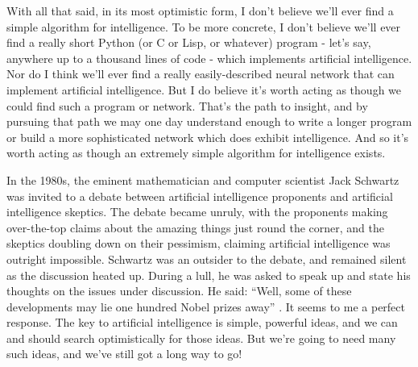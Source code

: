 With all that said, in its most optimistic form, I don't believe we'll ever find a simple algorithm for intelligence. To be more concrete, I don't believe we'll ever find a really short Python (or C or Lisp, or whatever) program - let's say, anywhere up to a thousand lines of code - which implements artificial intelligence. Nor do I think we'll ever find a really easily-described neural network that can implement artificial intelligence. But I do believe it's worth acting as though we could find such a program or network. That's the path to insight, and by pursuing that path we may one day understand enough to write a longer program or build a more sophisticated network which does exhibit intelligence. And so it's worth acting as though an extremely simple algorithm for intelligence exists.

In the 1980s, the eminent mathematician and computer scientist Jack Schwartz was invited to a debate between artificial intelligence proponents and artificial intelligence skeptics. The debate became unruly, with the proponents making over-the-top claims about the amazing things just round the corner, and the skeptics doubling down on their pessimism, claiming artificial intelligence was outright impossible. Schwartz was an outsider to the debate, and remained silent as the discussion heated up. During a lull, he was asked to speak up and state his thoughts on the issues under discussion. He said: ``Well, some of these developments may lie one hundred Nobel prizes away'' \cite[p22]{Rota2008}. It seems to me a perfect response. The key to artificial intelligence is simple, powerful ideas, and we can and should search optimistically for those ideas. But we're going to need many such ideas, and we've still got a long way to go!

